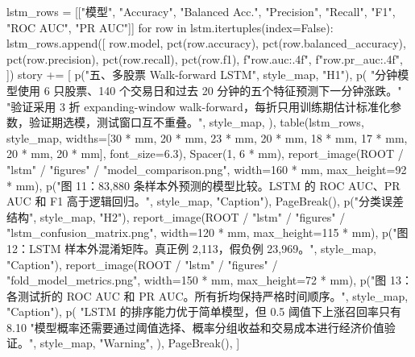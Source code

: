 \documentclass[UTF8,a4paper,fontset=fandol]{ctexart}
\begin{document}
\begin{ProjectCode}
{    lstm_rows = [["模型", "Accuracy", "Balanced Acc.", "Precision", "Recall", "F1", "ROC AUC", "PR AUC"]]
    for row in lstm.itertuples(index=False):
        lstm_rows.append([
            row.model,
            pct(row.accuracy),
            pct(row.balanced_accuracy),
            pct(row.precision),
            pct(row.recall),
            pct(row.f1),
            f"{row.auc:.4f}",
            f"{row.pr_auc:.4f}",
        ])
    story += [
        p("五、多股票 Walk-forward LSTM", style_map, "H1"),
        p(
            "分钟模型使用 6 只股票、140 个交易日和过去 20 分钟的五个特征预测下一分钟涨跌。"
            "验证采用 3 折 expanding-window walk-forward，每折只用训练期估计标准化参数，验证期选模，测试窗口互不重叠。",
            style_map,
        ),
        table(lstm_rows, style_map, widths=[30 * mm, 20 * mm, 23 * mm, 20 * mm, 18 * mm, 17 * mm, 20 * mm, 20 * mm], font_size=6.3),
        Spacer(1, 6 * mm),
        report_image(ROOT / "lstm" / "figures" / "model_comparison.png", width=160 * mm, max_height=92 * mm),
        p("图 11：83,880 条样本外预测的模型比较。LSTM 的 ROC AUC、PR AUC 和 F1 高于逻辑回归。", style_map, "Caption"),
        PageBreak(),
        p("分类误差结构", style_map, "H2"),
        report_image(ROOT / "lstm" / "figures" / "lstm_confusion_matrix.png", width=120 * mm, max_height=115 * mm),
        p("图 12：LSTM 样本外混淆矩阵。真正例 2,113，假负例 23,969。", style_map, "Caption"),
        report_image(ROOT / "lstm" / "figures" / "fold_model_metrics.png", width=150 * mm, max_height=72 * mm),
        p("图 13：各测试折的 ROC AUC 和 PR AUC。所有折均保持严格时间顺序。", style_map, "Caption"),
        p(
            "LSTM 的排序能力优于简单模型，但 0.5 阈值下上涨召回率只有 8.10%
            "模型概率还需要通过阈值选择、概率分组收益和交易成本进行经济价值验证。",
            style_map,
            "Warning",
        ),
        PageBreak(),
    ]

}
\end{ProjectCode}
\end{document}
